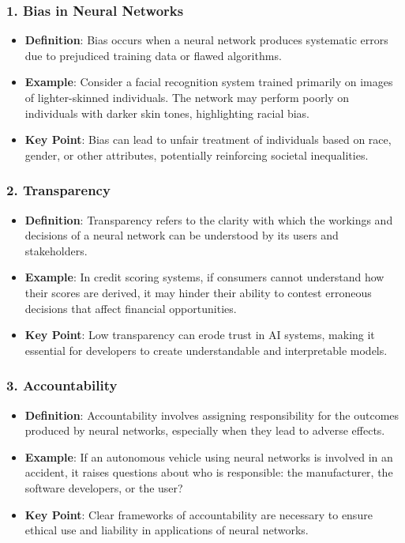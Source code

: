 \documentclass[aspectratio=169]{beamer}
\begin{document}
\begin{frame}[fragile]
  \frametitle{1. Bias in Neural Networks}
  \begin{itemize}
    \item \textbf{Definition}: Bias occurs when a neural network produces systematic errors due to prejudiced training data or flawed algorithms.
    \item \textbf{Example}: Consider a facial recognition system trained primarily on images of lighter-skinned individuals. The network may perform poorly on individuals with darker skin tones, highlighting racial bias.
    \item \textbf{Key Point}: Bias can lead to unfair treatment of individuals based on race, gender, or other attributes, potentially reinforcing societal inequalities.
  \end{itemize}
\end{frame}

\begin{frame}[fragile]
  \frametitle{2. Transparency}
  \begin{itemize}
    \item \textbf{Definition}: Transparency refers to the clarity with which the workings and decisions of a neural network can be understood by its users and stakeholders.
    \item \textbf{Example}: In credit scoring systems, if consumers cannot understand how their scores are derived, it may hinder their ability to contest erroneous decisions that affect financial opportunities.
    \item \textbf{Key Point}: Low transparency can erode trust in AI systems, making it essential for developers to create understandable and interpretable models.
  \end{itemize}
\end{frame}

\begin{frame}[fragile]
  \frametitle{3. Accountability}
  \begin{itemize}
    \item \textbf{Definition}: Accountability involves assigning responsibility for the outcomes produced by neural networks, especially when they lead to adverse effects.
    \item \textbf{Example}: If an autonomous vehicle using neural networks is involved in an accident, it raises questions about who is responsible: the manufacturer, the software developers, or the user?
    \item \textbf{Key Point}: Clear frameworks of accountability are necessary to ensure ethical use and liability in applications of neural networks.
  \end{itemize}
\end{frame}
\end{document}
